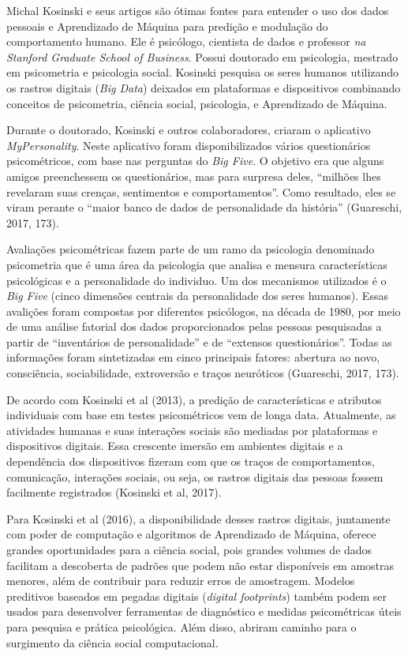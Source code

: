Michal Kosinski e seus artigos são ótimas fontes para entender o uso dos
dados pessoais e Aprendizado de Máquina para predição e modulação do
comportamento humano. Ele é psicólogo, cientista de dados e professor
\emph{na Stanford Graduate School of Business}. Possui doutorado em
psicologia, mestrado em psicometria e psicologia social. Kosinski
pesquisa os seres humanos utilizando os rastros digitais (\emph{Big
Data}) deixados em plataformas e dispositivos combinando conceitos de
psicometria, ciência social, psicologia, e Aprendizado de Máquina.

Durante o doutorado, Kosinski e outros colaboradores, criaram o
aplicativo \emph{MyPersonality}. Neste aplicativo foram disponibilizados
vários questionários psicométricos, com base nas perguntas do \emph{Big
Five}. O objetivo era que alguns amigos preenchessem os questionários,
mas para surpresa deles, ``milhões lhes revelaram suas crenças,
sentimentos e comportamentos''. Como resultado, eles se viram perante o
``maior banco de dados de personalidade da história'' (Guareschi, 2017,
173).

Avaliações psicométricas fazem parte de um ramo da psicologia denominado
psicometria que é uma área da psicologia que analisa e mensura
características psicológicas e a personalidade do individuo. Um dos
mecanismos utilizados é o \emph{Big Five} (cinco dimensões centrais da
personalidade dos seres humanos). Essas avalições foram compostas por
diferentes psicólogos, na década de 1980, por meio de uma análise
fatorial dos dados proporcionados pelas pessoas pesquisadas a partir de
``inventários de personalidade'' e de ``extensos questionários''. Todas
as informações foram sintetizadas em cinco principais fatores: abertura
ao novo, consciência, sociabilidade, extroversão e traços neuróticos
(Guareschi, 2017, 173).

De acordo com Kosinski et al (2013), a predição de características e
atributos individuais com base em testes psicométricos vem de longa
data. Atualmente, as atividades humanas e suas interações sociais são
mediadas por plataformas e dispositivos digitais. Essa crescente imersão
em ambientes digitais e a dependência dos dispositivos fizeram com que
os traços de comportamentos, comunicação, interações sociais, ou seja,
os rastros digitais das pessoas fossem facilmente registrados (Kosinski
et al, 2017).

Para Kosinski et al (2016), a disponibilidade desses rastros digitais,
juntamente com poder de computação e algoritmos de Aprendizado de
Máquina, oferece grandes oportunidades para a ciência social, pois
grandes volumes de dados facilitam a descoberta de padrões que podem não
estar disponíveis em amostras menores, além de contribuir para reduzir
erros de amostragem. Modelos preditivos baseados em pegadas digitais
(\emph{digital footprints}) também podem ser usados para desenvolver
ferramentas de diagnóstico e medidas psicométricas úteis para pesquisa e
prática psicológica. Além disso, abriram caminho para o surgimento da
ciência social computacional.

